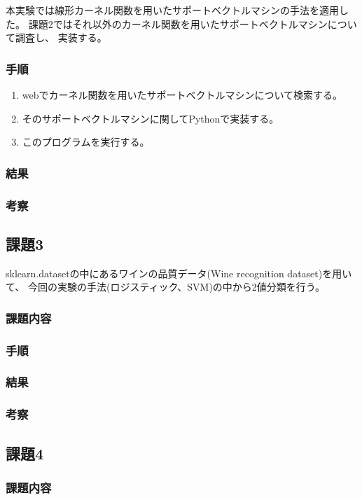\documentclass[12pt]{jarticle}
\begin{document}
本実験では線形カーネル関数を用いたサポートベクトルマシンの手法を適用した。
課題2ではそれ以外のカーネル関数を用いたサポートベクトルマシンについて調査し、
実装する。

\subsubsection*{手順}
\begin{enumerate}
    \item webでカーネル関数を用いたサポートベクトルマシンについて検索する。
    \item そのサポートベクトルマシンに関してPythonで実装する。
    \item このプログラムを実行する。
\end{enumerate}

\subsubsection*{結果}
\subsubsection*{考察}
\subsection{課題3}
sklearn.datasetの中にあるワインの品質データ(Wine recognition dataset)を用いて、
今回の実験の手法(ロジスティック、SVM)の中から2値分類を行う。
\subsubsection*{課題内容}
\subsubsection*{手順}
\subsubsection*{結果}
\subsubsection*{考察}
\subsection{課題4}
\subsubsection*{課題内容}
\end{document}
